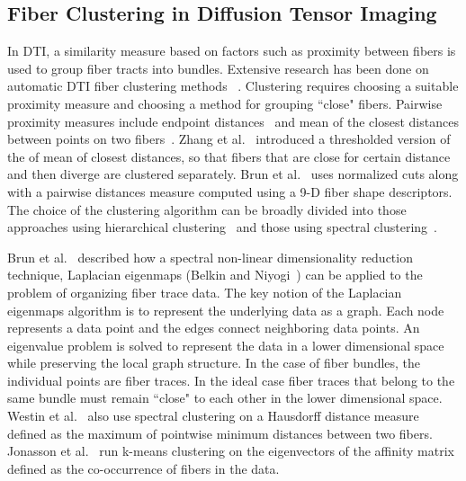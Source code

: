 \subsection {Fiber Clustering in Diffusion Tensor Imaging}
\label {subsec:fiberClus}
In DTI, a similarity measure based on factors such as proximity between fibers is used to group fiber tracts into bundles. Extensive research has been done on automatic DTI fiber clustering methods~ \cite{Brun2004,Brun2003,Corouge2004,westinMEDIA02,Zhang2008}. 
Clustering requires choosing a suitable proximity measure and choosing a method for grouping ``close" fibers.
Pairwise proximity measures include endpoint distances~\cite{Brun2003} and mean of the closest distances between points on two fibers~\cite{Corouge2004}. Zhang et al.~\cite{Zhang2008} introduced a thresholded version of the of mean of closest distances, so that fibers that are close for certain distance and then diverge are clustered separately. Brun et al.~\cite{Brun2004} uses normalized cuts along with a pairwise distances  measure computed using a 9-D fiber shape descriptors. The choice of the clustering algorithm can be broadly divided into those approaches using hierarchical clustering~\cite{Moberts2005, Zhang2008} and those using spectral clustering~\cite{ Brun2004,jonasson2005, ODonnell2007}.
 
Brun et al.~\cite{Brun2003} described how a spectral non-linear dimensionality reduction technique,  Laplacian eigenmaps (Belkin and Niyogi~\cite{Belkin01}) can be applied to the problem of organizing fiber trace data. The key notion of the Laplacian eigenmaps algorithm is to represent the underlying data as a graph. Each node represents a data point and the edges connect neighboring data points. An eigenvalue problem is solved to represent the data in a lower dimensional space while preserving the local graph structure. In the case of fiber bundles, the individual points are fiber traces. In the ideal case fiber traces that belong to the same bundle must remain ``close" to each other in the lower dimensional space. Westin et al.~\cite{westinMEDIA02} also use spectral clustering on a Hausdorff distance measure defined as the maximum of pointwise minimum distances between two fibers. Jonasson et al.~\cite{jonasson2005} run k-means clustering on the eigenvectors of the affinity matrix defined as the co-occurrence of fibers in the data.

